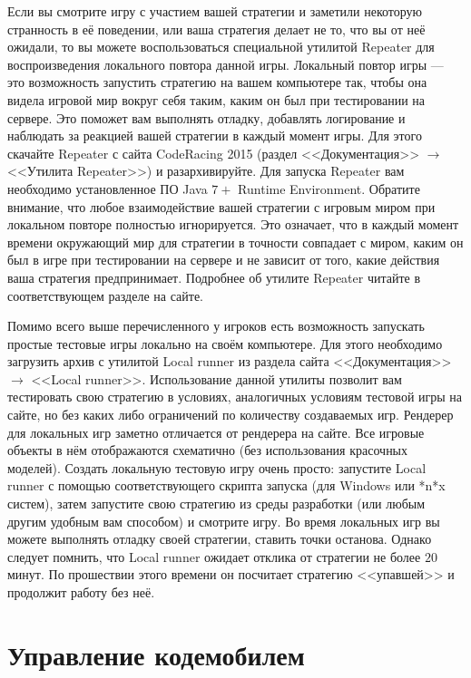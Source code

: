 Если вы смотрите игру с участием вашей стратегии и заметили некоторую странность в её поведении, или ваша стратегия делает не то, что вы от
неё ожидали, то вы можете воспользоваться специальной утилитой Repeater для воспроизведения локального повтора данной игры. Локальный повтор
игры --- это возможность запустить стратегию на вашем компьютере так, чтобы она видела игровой мир вокруг себя таким, каким он был при
тестировании на сервере. Это поможет вам выполнять отладку, добавлять логирование и наблюдать за реакцией вашей стратегии в каждый момент
игры. Для этого скачайте Repeater с сайта CodeRacing 2015 (раздел <<Документация>> $\rightarrow$ <<Утилита Repeater>>) и разархивируйте. Для
запуска Repeater вам необходимо установленное ПО Java $7+$ Runtime Environment. Обратите внимание, что любое взаимодействие вашей стратегии
с игровым миром при локальном повторе полностью игнорируется. Это означает, что в каждый момент времени окружающий мир для стратегии в
точности совпадает с миром, каким он был в игре при тестировании на сервере и не зависит от того, какие действия ваша стратегия
предпринимает. Подробнее об утилите Repeater читайте в соответствующем разделе на сайте.

Помимо всего выше перечисленного у игроков есть возможность запускать простые тестовые игры локально на своём компьютере. Для этого
необходимо загрузить архив с утилитой Local runner из раздела сайта <<Документация>> $\rightarrow$ <<Local runner>>. Использование данной
утилиты позволит вам тестировать свою стратегию в условиях, аналогичных условиям тестовой игры на сайте, но без каких либо ограничений по
количеству создаваемых игр. Рендерер для локальных игр заметно отличается от рендерера на сайте. Все игровые объекты в нём отображаются
схематично (без использования красочных моделей). Создать локальную тестовую игру очень просто: запустите Local runner с помощью
соответствующего скрипта запуска (для Windows или *n*x систем), затем запустите свою стратегию из среды разработки (или любым другим удобным
вам способом) и смотрите игру. Во время локальных игр вы можете выполнять отладку своей стратегии, ставить точки останова. Однако следует
помнить, что Local runner ожидает отклика от стратегии не более $20$ минут. По прошествии этого времени он посчитает стратегию <<упавшей>> и
продолжит работу без неё.

\section{Управление кодемобилем}

